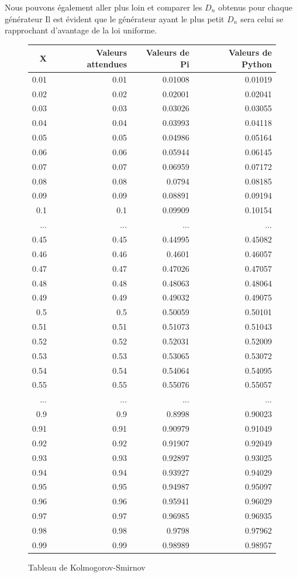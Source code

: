 \documentclass[10pt,a4paper]{article}
\begin{document}
	Nous pouvons également aller plus loin et comparer les $D_n$ obtenus pour chaque générateur
	 Il est évident que le générateur ayant le plus petit $D_n$ sera celui se rapprochant d'avantage de la loi uniforme.
	\begin{figure}[h]
		\centering
		\begin{tabular}{|r|r|r|r|}
			\hline
			X & Valeurs attendues & Valeurs de Pi & Valeurs de Python\\
			\hline
			0.01 & 0.01 & 0.01008 & 0.01019\\
			0.02 & 0.02 & 0.02001 & 0.02041\\
			0.03 & 0.03 & 0.03026 & 0.03055\\
			0.04 & 0.04 & 0.03993 & 0.04118\\
			0.05 & 0.05 & 0.04986 & 0.05164\\
			0.06 & 0.06 & 0.05944 & 0.06145\\
			0.07 & 0.07 & 0.06959 & 0.07172\\
			0.08 & 0.08 & 0.0794 & 0.08185\\
			0.09 & 0.09 & 0.08891 & 0.09194\\
			0.1 & 0.1 & 0.09909 & 0.10154\\
			... & ... & ... & ...\\
			0.45 & 0.45 & 0.44995 & 0.45082\\
			0.46 & 0.46 & 0.4601 & 0.46057\\
			0.47 & 0.47 & 0.47026 & 0.47057\\
			0.48 & 0.48 & 0.48063 & 0.48064\\
			0.49 & 0.49 & 0.49032 & 0.49075\\
			0.5 & 0.5 & 0.50059 & 0.50101\\
			0.51 & 0.51 & 0.51073 & 0.51043\\
			0.52 & 0.52 & 0.52031 & 0.52009\\
			0.53 & 0.53 & 0.53065 & 0.53072\\
			0.54 & 0.54 & 0.54064 & 0.54095\\
			0.55 & 0.55 & 0.55076 & 0.55057\\
			... & ... & ... & ...\\
			0.9 & 0.9 & 0.8998 & 0.90023\\
			0.91 & 0.91 & 0.90979 & 0.91049\\
			0.92 & 0.92 & 0.91907 & 0.92049\\
			0.93 & 0.93 & 0.92897 & 0.93025\\
			0.94 & 0.94 & 0.93927 & 0.94029\\
			0.95 & 0.95 & 0.94987 & 0.95097\\
			0.96 & 0.96 & 0.95941 & 0.96029\\
			0.97 & 0.97 & 0.96985 & 0.96935\\
			0.98 & 0.98 & 0.9798 & 0.97962\\
			0.99 & 0.99 & 0.98989 & 0.98957\\
			\hline
		\end{tabular}
	\caption{Tableau de Kolmogorov-Smirnov}
	\end{figure}
	
\end{document}
